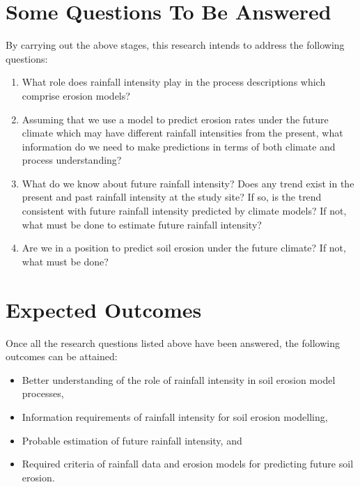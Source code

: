 \section{Some Questions To Be Answered}
\label{sec:ResearchQuestions}
By carrying out the above stages, this research intends to address the following
questions:
\begin{enumerate}[{Question} 1.]
  \item What role does rainfall intensity play in the process descriptions which
comprise erosion models?\label{researchquestion1}
  \item Assuming that we use a model to predict erosion rates under the future
climate which may have different rainfall intensities from the present, what
information do we need to make predictions in terms of both climate and process
understanding?\label{researchquestion2}
  \item What do we know about future rainfall intensity? Does any trend exist in
the present and past rainfall intensity at the study site? If so, is the trend
consistent with future rainfall intensity predicted by climate models? If not,
what must be done to estimate future rainfall intensity?
\label{researchquestion3}
  \item Are we in a position to predict soil erosion under the future climate?
If not, what must be done?\label{researchquestion4}
\end{enumerate}

\section{Expected Outcomes}
\label{sec:ExpectedOutcomes}
Once all the research questions listed above have been answered, the following
outcomes can be attained:
\begin{itemize}
  \item Better understanding of the role of rainfall intensity in soil erosion
model processes,
  \item Information requirements of rainfall intensity for soil erosion
modelling,
  \item Probable estimation of future rainfall intensity, and
  \item Required criteria of rainfall data and erosion models for predicting
future soil erosion.
\end{itemize}

